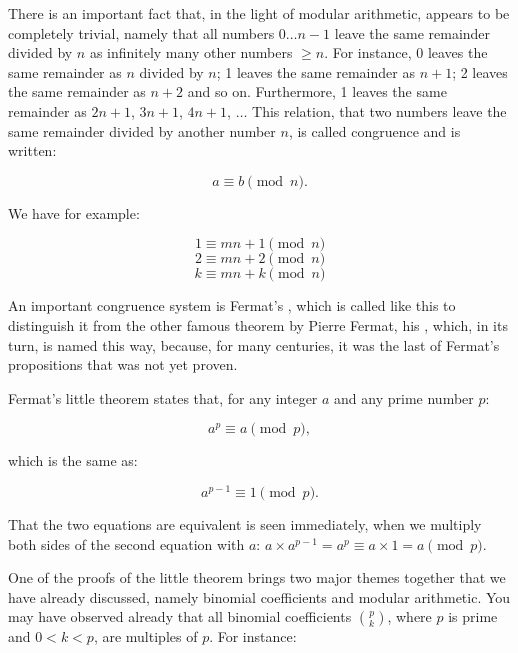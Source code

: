 \documentclass{scrreprt}
\begin{document}
There is an important fact 
that, in the light of modular arithmetic,
appears to be completely trivial,
namely that all numbers $0\dots n-1$
leave the same remainder divided by $n$
as infinitely
many other numbers $\ge n$.
For instance, 0 leaves the same remainder
as $n$ divided by $n$;
1 leaves the same remainder as $n+1$;
2 leaves the same remainder as $n+2$
and so on.
Furthermore, 1 leaves the same remainder as $2n + 1$,
$3n + 1$, $4n + 1$, $\dots$
This relation, that two numbers leave the same remainder
divided by another number $n$, is called congruence
and is written:

\[
a \equiv b \pmod{n}.
\]

We have for example:

\begin{equation}
1 \equiv mn + 1 \pmod{n}
\end{equation}
\begin{equation}
2 \equiv mn + 2 \pmod{n}
\end{equation}
\begin{equation}
k \equiv mn+k \pmod{n}
\end{equation}

An important congruence system is
Fermat's ,
which is called like this to distinguish it
from the other famous theorem by Pierre Fermat,
his , which, in its turn,
is named this way, because, for many centuries,
it was the last of Fermat's propositions
that was not yet proven.

Fermat's little theorem states that,
for any integer $a$ and any prime number $p$:

\begin{equation}
a^p \equiv a \pmod{p},
\end{equation}

which is the same as:

\begin{equation}
a^{p-1} \equiv 1 \pmod{p}.
\end{equation}

That the two equations are equivalent
is seen immediately,
when we multiply both sides 
of the second equation with $a$:
$a \times a^{p-1} = a^p \equiv a \times 1 = a \pmod{p}$.

One of the proofs of the little theorem brings two major themes
together that we have already discussed,
namely binomial coefficients and modular arithmetic.
You may have observed already that 
all binomial coefficients $\binom{p}{k}$,
where $p$ is prime and $0 < k < p$, are multiples of $p$.
For instance:
\end{document}
